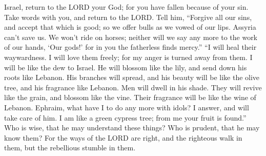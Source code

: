  Israel, return to the LORD your God; for you have fallen
because of your sin.  Take words with you, and return to the
LORD. Tell him, ``Forgive all our sins, and accept that which is good;
so we offer bulls as we vowed of our lips.  Assyria can't
save us. We won't ride on horses; neither will we say any more to the
work of our hands, `Our gods!' for in you the fatherless finds mercy.''
 ``I will heal their waywardness. I will love them freely;
for my anger is turned away from them.  I will be like the
dew to Israel. He will blossom like the lily, and send down his roots
like Lebanon.  His branches will spread, and his beauty will
be like the olive tree, and his fragrance like Lebanon.  Men
will dwell in his shade. They will revive like the grain, and blossom
like the vine. Their fragrance will be like the wine of Lebanon.
 Ephraim, what have I to do any more with idols? I answer,
and will take care of him. I am like a green cypress tree; from me your
fruit is found.''  Who is wise, that he may understand these
things? Who is prudent, that he may know them? For the ways of the LORD
are right, and the righteous walk in them, but the rebellious stumble in
them.
